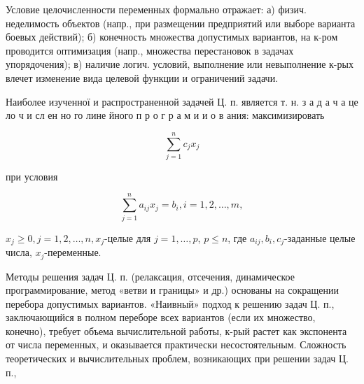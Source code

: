 \documentclass[10pt]{article}
\begin{document}
Условие целочисленности переменных формально отражает: а) физич. неделимость объектов (напр., при размещении предприятий или выборе варианта боевых действий); б) конечность множества допустимых вариантов, на к-ром проводится оптимизация (напр., множества перестановок в задачах упорядочения); в) наличие логич. условий, выполнение или невыполнение к-рых влечет изменение вида целевой функции и ограничений задачи.



Наиболее изученної и распространенной задачей Ц. п. является т. н. з а д а ч а це ло ч и сл ен но го лине йного п р о г р а м и и о в ания: максимизировать



\[

\sum_{j=1}^{n} c_{j} x_{j}

\]



при условия



\[

\sum_{j=1}^{n} a_{i j} x_{j}=b_{i}, i=1,2, \ldots, m,

\]



$x_{j} \geqslant 0, j=1,2, \ldots, n, x_{j}$-целые для $j=1, \ldots, p$, $p \leqslant n$, где $a_{i j}, b_{i}, c_{j}$-заданные целые числа, $x_{j}$-переменные.



Методы решения задач Ц. п. (релаксация, отсечения, динамическое программирование, метод «ветви и границы» и др.) основаны на сокращении перебора допустимых вариантов. «Наивный» подход к решению задач Ц. п., заключающийся в полном переборе всех вариантов (если их множество, конечно), требует объема вычислительной работы, к-рый растет как экспонента от числа переменных, и оказывается практически несостоятельным. Сложность теоретических и вычислительных проблем, возникающих при решении задач Ц. п.,
\end{document}
